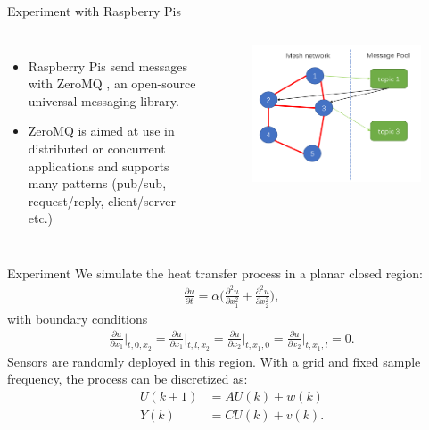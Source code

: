 \documentclass[10pt]{beamer}
\DeclareMathOperator{\1}{\textbf{1}}
\begin{document}
\begin{frame}{Experiment with Raspberry Pis}
	\begin{columns}[c]
		\column{7cm}
		\begin{itemize}
			\item Raspberry Pis send messages with ZeroMQ \cite{ZeroMQ}, an open-source universal messaging library.
			\item ZeroMQ is aimed at use in distributed or concurrent applications and supports many patterns (pub/sub, request/reply, client/server etc.)
		\end{itemize}
		\column{5cm}
		\begin{figure}
			\centering
			\includegraphics[width=1\textwidth]{pic/msg.png}
		\end{figure}
		\end{columns}
\end{frame}

\begin{frame}{Experiment}
	We simulate the heat transfer process in a planar closed region:
	\begin{align*}
	\frac{\partial u}{\partial t}=\alpha\Big(\frac{\partial^2u}{\partial x_1^2}+\frac{\partial^2u}{\partial x_2^2}\Big),
	\end{align*}
	with boundary conditions
	\begin{align*}
	\frac{\partial u}{\partial x_1}\Big|_{t,0,x_2}=\frac{\partial u}{\partial x_1}\Big|_{t,l,x_2}=\frac{\partial u}{\partial x_2}\Big|_{t,x_1,0}=\frac{\partial u}{\partial x_2}\Big|_{t,x_1,l}=0.
	\end{align*}
	Sensors are randomly deployed in this region. With a grid and fixed sample frequency, the process can be discretized as:
	\begin{align*}
		U(k+1)&=AU(k)+w(k)\\
		Y(k)&=CU(k)+v(k).
	\end{align*}
\end{frame}
\end{document}
